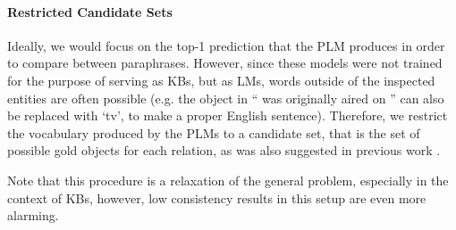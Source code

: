 \paragraph{Restricted Candidate Sets}
Ideally, we would focus on the top-1 prediction that the PLM produces in order to compare between paraphrases. However, since these models were not trained for the purpose of serving as KBs, but as LMs, words outside of the inspected entities are often possible (e.g. the object in ``\subj{} was originally aired on \obj{}'' can also be replaced with `tv', to make a proper English sentence).
Therefore, we restrict the vocabulary produced by the PLMs to a candidate set, that is the set of possible gold objects for each relation, as was also suggested in previous work \cite{Xiong2020Pretrained, nora@@}.

Note that this procedure is a relaxation of the general problem, especially in the context of KBs, however, low consistency results in this setup are even more alarming.
